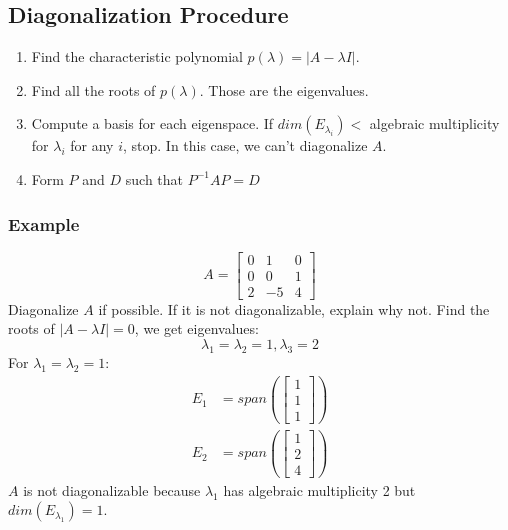 \documentclass{math}
\begin{document}
\subsection*{Diagonalization Procedure}
\begin{enumerate}[1)]
  \item Find the characteristic polynomial \( p(\lambda) = |A-\lambda I| \).
  \item Find all the roots of \( p(\lambda) \). Those are the eigenvalues.
  \item Compute a basis for each eigenspace. If \( dim(E_{\lambda_i}) < \)
  algebraic multiplicity for \( \lambda_i \) for any \( i \), stop. In this
  case, we can't diagonalize \( A \).
  \item Form \( P \) and \( D \) such that \( P^{-1}AP = D \)
\end{enumerate}

\subsubsection*{Example}
\[ A = \begin{bmatrix}0 & 1 & 0 \\ 0 & 0 & 1 \\ 2 & -5 & 4\end{bmatrix} \]
Diagonalize \( A \) if possible. If it is not diagonalizable, explain why not.
Find the roots of \( |A-\lambda I| = 0 \), we get eigenvalues:
\[ \lambda_1 = \lambda_2 = 1, \lambda_3 = 2 \]
For \( \lambda_1 = \lambda_2 = 1 \):
\begin{align*}
  E_1 &= span\left(\begin{bmatrix}1 \\ 1 \\ 1\end{bmatrix}\right) \\
  E_2 &= span\left(\begin{bmatrix}1 \\ 2 \\ 4\end{bmatrix}\right)
\end{align*}
\( A \) is not diagonalizable because \( \lambda_1 \) has algebraic multiplicity
2 but \( dim(E_{\lambda_1}) = 1 \).
\end{document}
